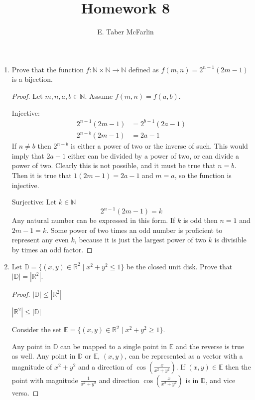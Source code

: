 \documentclass[12pt,a4paper,reqno,parskip=full]{amsart}
\numberwithin{equation}{section}
\theoremstyle{plain}
\theoremstyle{definition}
\renewcommand{\leq}{\leqslant}
\renewcommand{\geq}{\geqslant}
\begin{document}
\title{Homework 8}

\author{E. Taber McFarlin}

\maketitle

\begin{enumerate}
  \item Prove that the function $f:\mathbb{N} \times\mathbb{N} \to\mathbb{N}$ defined as
        $f(m,n)=2^{n-1}(2m-1)$ is a bijection.

        \begin{proof} Let $m,n,a,b\in\mathbb{N}$. Assume $f(m,n) = f(a,b)$.

          Injective:
          \begin{align*}
            2^{n - 1}(2m - 1) & = 2^{b - 1}(2a - 1) \\
            2^{n - b}(2m - 1) & = 2a - 1
          \end{align*}
          If $n \neq b$ then $2^{n - b}$ is either a power of two or the inverse of such. This would
          imply that $2a - 1$ either can be divided by a power of two, or can divide a power of two.
          Clearly this is not possible, and it must be true that $n = b$. Then it is true that
          $1(2m - 1) = 2a - 1$ and $m = a$, so the function is injective.

          Surjective: Let $k\in\mathbb{N}$
          \[2^{n - 1}(2m - 1) = k\]
          Any natural number can be expressed in this form. If $k$ is odd then $n = 1$ and
          $2m - 1 = k$. Some power of two times an odd number is proficient to represent any even
          $k$, because it is just the largest power of two $k$ is divisible by times an odd factor.
        \end{proof}
  \item Let $\mathbb{D}=\{(x,y)\in\mathbb{R}^2\mid x^2+y^2\leq 1\}$ be the closed unit disk. Prove
        that $|\mathbb{D}| = |\mathbb{R}^2|$.
        \begin{proof}
          $|\mathbb{D}| \leq |\mathbb{R}^2|$

          $|\mathbb{R}^2| \leq |\mathbb{D}|$

          Consider the set $\mathbb{E} = \{(x,y)\in\mathbb{R}^2\mid x^2+y^2\geq 1\}$.

          Any point in $\mathbb{D}$ can be mapped to a single point in $\mathbb{E}$ and the reverse
          is true as well. Any point in $\mathbb{D}$ or $\mathbb{E}$, $(x, y)$, can be represented
          as a vector with a magnitude of $x^2+y^2$ and a direction of
          $\displaystyle\cos\left(\frac{x}{x^2+y^2}\right)$. If $(x, y)\in\mathbb{E}$ then the point
          with magnitude $\displaystyle\frac{1}{x^2+y^2}$ and direction
          $\displaystyle\cos\left(\frac{x}{x^2+y^2}\right)$ is in $\mathbb{D}$, and vice versa.


\end{proof}
\end{enumerate}
\end{document}
